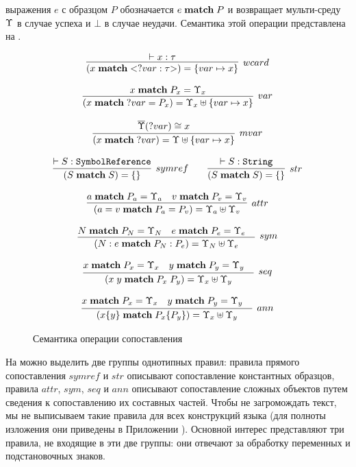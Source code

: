  выражения $e$ с образцом $P$ обозначается
$e \; \mathbf{match} \; P$ и возвращает мульти-среду $\Upsilon$ в случае успеха и $\bot$ в случае неудачи. Семантика этой операции представлена на .
\begin{figure}[htbp]
$$
\begin{array}{c}
\infer[wcard]{
	(\match{x}{\wcard{?var}{\tau}}) = \meitem{var}{x}
}{\vdash x : \tau}
%
\\
\,\\
%
\infer[var]{
	(\match{x}{?var = P_x}) = \ME_x \mejoin \meitem{var}{x}
}{
\match{x}{P_x} = \ME_x
}
%
\\
\,\\
%
\infer[mvar]{
	(\match{x}{?var}) = \ME \mejoin \meitem{var}{x}
}{
\meflatten{\ME}(?var) \cong x
}
%
\\
\,\\
%
\infer[symref]{(\match{S}{S}) = \meempty}{\vdash S : \mathtt{SymbolReference}}
\qquad
\infer[str]{(\match{S}{S}) = \meempty}{\vdash S : \mathtt{String}}
%
\\
\,\\
%
\infer[attr]{
	(\match{a = v}{P_a = P_v}) = \ME_a \mejoin \ME_v
}{
\match{a}{P_a} = \ME_a &
\match{v}{P_v} = \ME_v
}
%
\\
\,\\
%
\infer[sym]{
	(\match{N : e}{P_N : P_e}) = \ME_N \mejoin \ME_e
}{
\match{N}{P_N} = \ME_N &
\match{e}{P_e} = \ME_e &
}
%
\\
\,\\
%
\infer[seq]{
	(\match{x \; y}{P_x \; P_y}) = \ME_x \mejoin \ME_y
}{
	\match{x}{P_x} = \ME_x &
	\match{y}{P_y} = \ME_y &
}
%
\\
\,\\
%
\infer[ann]{
	(\match{x \{y\}}{P_x \{P_y\}}) = \ME_x \mejoin \ME_y
}{
	\match{x}{P_x} = \ME_x &
	\match{y}{P_y} = \ME_y &
}
\end{array}
$$
	\centering
	\caption{Семантика операции сопоставления}\label{MatchSem}
\end{figure}
\newcommand{\ruleref}[1]{$#1$}

На  можно выделить две группы однотипных правил: правила прямого сопоставления \ruleref{symref} и \ruleref{str} описывают сопоставление константных образцов, правила \ruleref{attr}, \ruleref{sym}, \ruleref{seq} и \ruleref{ann} описывают сопоставление сложных объектов путем сведения к сопоставлению их составных частей. Чтобы не загромождать текст, мы не выписываем такие правила для всех конструкций языка (для полноты изложения они приведены в Приложении ). Основной интерес представляют три правила, не входящие в эти две группы: они отвечают за обработку переменных и подстановочных знаков.

